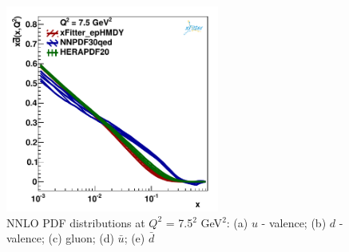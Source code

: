 \begin{figure}
\includegraphics[width=7cm]{dbar_7_5.pdf} 
\caption{NNLO PDF distributions at $Q^{2}$ = 7.5$^{2}$ GeV$^{2}$: (a) $u$ - valence; (b) $d$ - valence; (c) gluon; (d) $\bar{u}$; (e) $\bar{d}$ }
\label{PDF_7.5GeV}
\end{figure}
